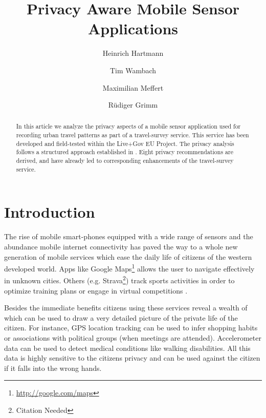 \documentclass[runningheads,a4paper]{llncs}
\begin{document}

\title{Privacy Aware Mobile Sensor Applications}
\author{Heinrich Hartmann \and Tim Wambach \and Maximilian Meffert \and R\"udiger Grimm}
\maketitle


\begin{abstract}

In this article we analyze the privacy aspects of a mobile sensor
application used for recording urban travel patterns as part of a
travel-survey service. This service has been developed and
field-tested within the Live+Gov EU Project. The privacy analysis
follows a structured approach established in
\cite{Grimm:ItSecRefModel}. Eight privacy recommendations are derived,
and have already led to corresponding enhancements of the
travel-survey service.

\end{abstract}


\section{Introduction}

The rise of mobile smart-phones equipped with a wide range of sensors
and the abundance mobile internet connectivity has paved the way to a
whole new generation of mobile services which ease the daily life of
citizens of the western developed world. Apps like Google
Maps\footnote{\url{http://google.com/maps}} allows the user to
navigate effectively in unknown cities. Others
(e.g. Strava\footnote{Citation Needed}) track sports activities in
order to optimize training plans or engage in virtual competitions .

Besides the immediate benefits citizens using these services reveal
a wealth of which can be used to draw a very detailed picture of the
private life of the citizen. For instance, GPS location tracking can
be used to infer shopping habits or associations with political groups
(when meetings are attended). Accelerometer data can be used to detect
medical conditions like walking disabilities. All this data is highly
sensitive to the citizens privacy and can be used against the citizen
if it falls into the wrong hands.
\end{document}

